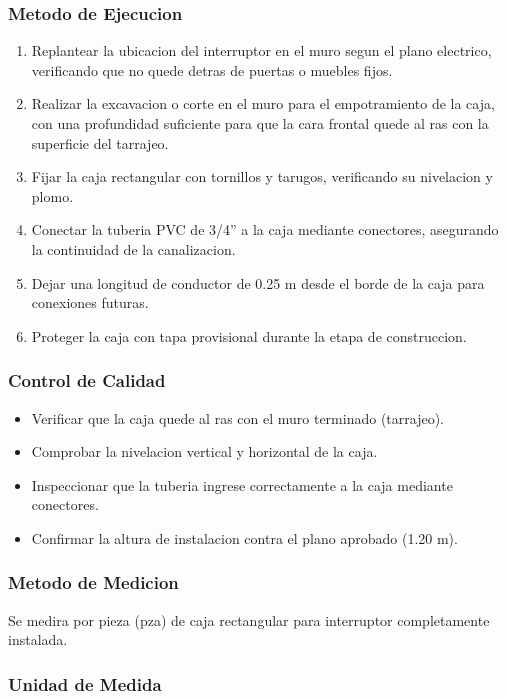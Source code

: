 \subsubsection{Metodo de Ejecucion}

\begin{enumerate}
  \item Replantear la ubicacion del interruptor en el muro segun el plano electrico, verificando que no quede detras de puertas o muebles fijos.
  \item Realizar la excavacion o corte en el muro para el empotramiento de la caja, con una profundidad suficiente para que la cara frontal quede al ras con la superficie del tarrajeo.
  \item Fijar la caja rectangular con tornillos y tarugos, verificando su nivelacion y plomo.
  \item Conectar la tuberia PVC de 3/4'' a la caja mediante conectores, asegurando la continuidad de la canalizacion.
  \item Dejar una longitud de conductor de 0.25 m desde el borde de la caja para conexiones futuras.
  \item Proteger la caja con tapa provisional durante la etapa de construccion.
\end{enumerate}

\subsubsection{Control de Calidad}

\begin{itemize}
  \item Verificar que la caja quede al ras con el muro terminado (tarrajeo).
  \item Comprobar la nivelacion vertical y horizontal de la caja.
  \item Inspeccionar que la tuberia ingrese correctamente a la caja mediante conectores.
  \item Confirmar la altura de instalacion contra el plano aprobado (1.20 m).
\end{itemize}

\subsubsection{Metodo de Medicion}

Se medira por pieza (pza) de caja rectangular para interruptor completamente instalada.

\subsubsection{Unidad de Medida}


